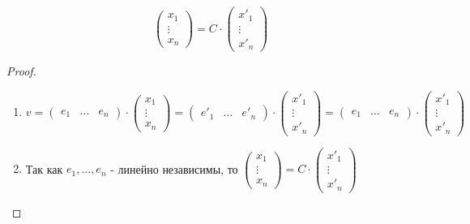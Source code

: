 \begin{proposal}
    
    $$\begin{pmatrix}
        x_1 \\ \vdots \\ x_n
    \end{pmatrix} = C \cdot \begin{pmatrix}
        x'_1 \\ \vdots \\ x'_n
    \end{pmatrix}$$

    \begin{proof}~
        
        \begin{enumerate}
            \item $v = \begin{pmatrix}
                e_1 & \dots & e_n
            \end{pmatrix} \cdot \begin{pmatrix}
                x_1 \\ \vdots \\ x_n
            \end{pmatrix} = \begin{pmatrix}
                e'_1 & \dots & e'_n
            \end{pmatrix} \cdot \begin{pmatrix}
                x'_1 \\ \vdots \\ x'_n
            \end{pmatrix} = \begin{pmatrix}
                e_1 & \dots & e_n
            \end{pmatrix} \cdot \begin{pmatrix}
                x'_1 \\ \vdots \\ x'_n
            \end{pmatrix}$
            \item Так как $e_1, \dots, e_n$ - линейно независимы, то $\begin{pmatrix}
                x_1 \\ \vdots \\ x_n
            \end{pmatrix} = C \cdot \begin{pmatrix}
                x'_1 \\ \vdots \\ x'_n
            \end{pmatrix}$
        \end{enumerate}

    \end{proof}

\end{proposal}


